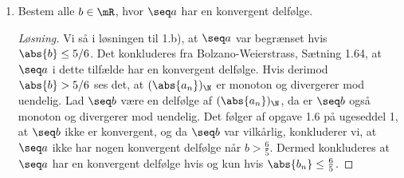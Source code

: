 \begin{opg}
\begin{enumerate}
    
    \item Bestem alle $b\in\mR$, hvor $\seq a$ har en konvergent delfølge.
    \begin{proof}[Løsning]
    	Vi så i løsningen til 1.b), at $ \seq a $ var begrænset hvis $ \abs{b}\leq 5/6 $. Det konkluderes fra Bolzano-Weierstrass, Sætning 1.64, at $ \seq a $ i dette tilfælde har en konvergent delfølge. Hvis derimod $ \abs{b}>5/6 $ ses det, at $ (\abs{a_n})_{\N} $ er monoton og divergerer mod uendelig. Lad $ \seq b $ være en delfølge af $ (\abs{a_n})_{\N} $, da er $ \seq b $ også monoton og divergerer mod uendelig. Det følger af opgave 1.6 på ugeseddel 1, at $ \seq b $ ikke er konvergent, og da $ \seq b $ var vilkårlig, konkluderer vi, at $ \seq a $ ikke har nogen konvergent delfølge når $ b>\frac{6}{5} $. Dermed konkluderes at $ \seq a $ har en konvergent delfølge hvis og kun hvis $ \abs{b_n}\leq \frac{6}{5} $. 
    \end{proof}

\end{enumerate}
\end{opg}
